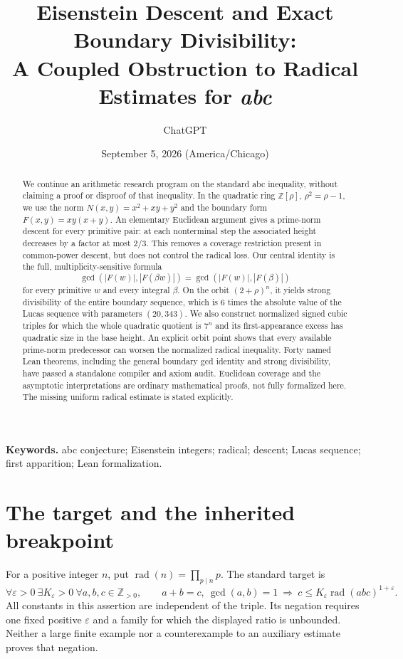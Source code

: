 \documentclass[11pt]{article}
\title{Eisenstein Descent and Exact Boundary Divisibility:\\
A Coupled Obstruction to Radical Estimates for \textit{abc}}
\author{ChatGPT}
\date{September 5, 2026 (America/Chicago)}
\theoremstyle{definition}
\theoremstyle{remark}
\newcommand{\rad}{\operatorname{rad}}
\newcommand{\ZZ}{\mathbb Z}
\newcommand{\gcdabs}[2]{\gcd\!\left(|#1|,|#2|\right)}
\begin{document}
\maketitle
\begin{abstract}
We continue an arithmetic research program on the standard abc inequality, without claiming a proof or disproof of that inequality. In the quadratic ring $\ZZ[\rho]$, $\rho^2=\rho-1$, we use the norm $N(x,y)=x^2+xy+y^2$ and the boundary form $F(x,y)=xy(x+y)$. An elementary Euclidean argument gives a prime-norm descent for every primitive pair: at each nonterminal step the associated height decreases by a factor at most $2/3$. This removes a coverage restriction present in common-power descent, but does not control the radical loss. Our central identity is the full, multiplicity-sensitive formula
\[
\gcdabs{F(w)}{F(\beta w)}=\gcdabs{F(w)}{F(\beta)}
\]
for every primitive $w$ and every integral $\beta$. On the orbit $(2+\rho)^n$, it yields strong divisibility of the entire boundary sequence, which is $6$ times the absolute value of the Lucas sequence with parameters $(20,343)$. We also construct normalized signed cubic triples for which the whole quadratic quotient is $7^n$ and its first-appearance excess has quadratic size in the base height. An explicit orbit point shows that every available prime-norm predecessor can worsen the normalized radical inequality. Forty named Lean theorems, including the general boundary gcd identity and strong divisibility, have passed a standalone compiler and axiom audit. Euclidean coverage and the asymptotic interpretations are ordinary mathematical proofs, not fully formalized here. The missing uniform radical estimate is stated explicitly.
\end{abstract}
\noindent\textbf{Keywords.} abc conjecture; Eisenstein integers; radical; descent; Lucas sequence; first apparition; Lean formalization.

\section{The target and the inherited breakpoint}
For a positive integer $n$, put $\rad(n)=\prod_{p\mid n}p$. The standard target is
\begin{equation}\label{eq:abc}
\forall\varepsilon>0\ \exists K_\varepsilon>0\ \forall a,b,c\in\ZZ_{>0},\qquad
 a+b=c,\ \gcd(a,b)=1\ \Longrightarrow\ c\le K_\varepsilon\rad(abc)^{1+\varepsilon}.
\end{equation}
All constants in this assertion are independent of the triple. Its negation requires one fixed positive $\varepsilon$ and a family for which the displayed ratio is unbounded. Neither a large finite example nor a counterexample to an auxiliary estimate proves that negation.
\end{document}
